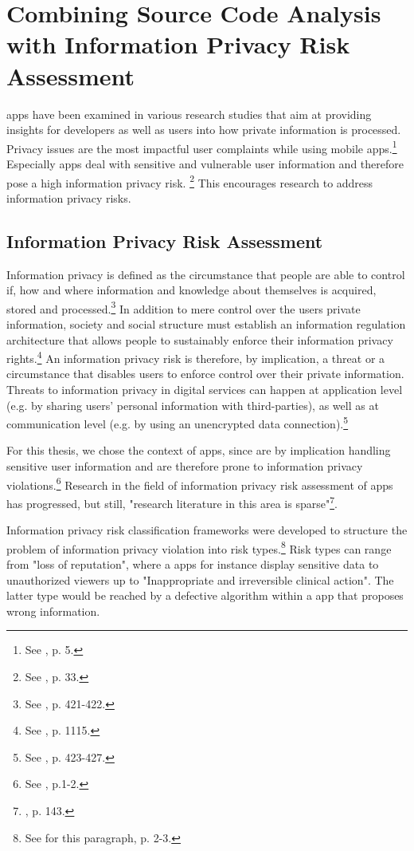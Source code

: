 \section{Combining Source Code Analysis with Information Privacy Risk Assessment}

\mH apps have been examined in various research studies that aim at providing insights for developers as well as users into how private information is processed.
Privacy issues are the most impactful user complaints while using mobile apps.\footnote{See \cite{Khalid2015}, p. 5.}
Especially \mH apps deal with sensitive and vulnerable user information and therefore pose a high information privacy risk. \footnote{See \cite{Kumar2013}, p. 33.}
This encourages research to address information privacy risks.

\subsection{Information Privacy Risk Assessment}

Information privacy is defined as the circumstance that people are able to control if, how and where information and knowledge about themselves is acquired, stored and processed.\footnote{See \cite{Fischer1998}, p. 421-422.}
In addition to mere control over the users private information, society and social structure must establish an information regulation architecture that allows people to sustainably enforce their information privacy rights.\footnote{See \cite{Solove2002}, p. 1115.}
An information privacy risk is therefore, by implication, a threat or a circumstance that disables users to enforce control over their private information.
Threats to information privacy in digital services can happen at application level (e.g. by sharing users' personal information with third-parties), as well as at communication level (e.g. by using an unencrypted data connection).\footnote{See \cite{Fischer1998}, p. 423-427.}

For this thesis, we chose the context of \mH apps, since \mH are by implication handling sensitive user information and are therefore prone to information privacy violations.\footnote{See \cite{Huckvale2015}, p.1-2.}
Research in the field of information privacy risk assessment of \mH apps has progressed, but still, "research literature in this area is sparse"\footnote{\cite{Arora2014}, p. 143.}.

Information privacy risk classification frameworks were developed to structure the problem of information privacy violation into risk types.\footnote{See for this paragraph\cite{Lewis2014}, p. 2-3.}
Risk types can range from "loss of reputation", where a \mH apps for instance display sensitive data to unauthorized viewers up to "Inappropriate and irreversible clinical action". 
The latter type would be reached by a defective algorithm within a \mH app that proposes wrong information.

